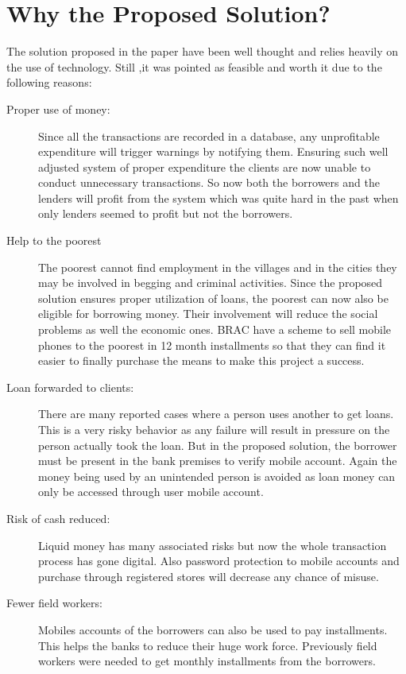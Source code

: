 \documentclass{report}
\begin{document}
\chapter{Why the Proposed Solution?}
The solution proposed in the paper have been well thought and relies heavily on the use of technology. Still ,it was pointed as feasible and worth it due to the following reasons:
\begin{description}
\item[Proper use of money:] Since all the transactions are recorded in a database, any unprofitable expenditure will trigger warnings by notifying them.  Ensuring such well adjusted system of proper expenditure the clients are now unable to conduct unnecessary transactions. So now both the borrowers and the lenders will profit from the system which was quite hard in the past when only lenders seemed to profit but not the borrowers.

\item[Help to the poorest]The poorest cannot find employment in the villages and in the cities they may be involved in begging and criminal activities. Since the proposed solution ensures proper utilization of loans, the poorest can now also be eligible for borrowing money. Their involvement will reduce the social problems as well the economic ones.
BRAC have a scheme to sell mobile phones to the poorest in 12 month installments so that they can find it easier to finally purchase the means to make this project a success\cite{18}.

\item[Loan forwarded to clients:]There are many reported cases where a person uses another to get loans. This is a very risky behavior as any failure will result in pressure on the person actually took the loan. But in the proposed solution, the borrower must be present in the bank premises to verify mobile account.
Again the money being used by an unintended person is avoided as loan money can only be accessed through user mobile account.

\item[Risk of cash reduced:]Liquid money has many associated risks but now the whole transaction process has gone digital. Also password protection to mobile accounts and purchase through registered stores will decrease any chance of misuse.

\item[Fewer field workers:]Mobiles accounts of the borrowers can also be used to pay installments. This helps the banks to reduce their huge work force. Previously field workers were needed to get monthly installments from the borrowers.
\end{description}
\newpage
\end{document}
